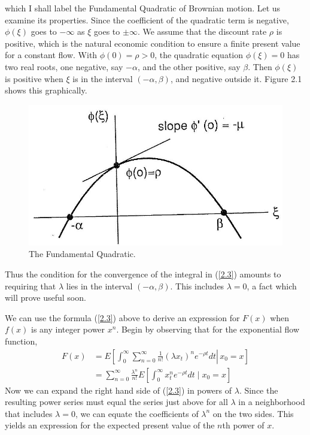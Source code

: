 \documentclass[12pt]{article}
\theoremstyle{definition}
\begin{document}
which I shall label the Fundamental Quadratic of Brownian motion. Let us examine its properties. Since the coefficient of the quadratic term is negative, $\phi(\xi)$ goes to $-\infty$ as $\xi$ goes to $\pm \infty$. We assume that the discount rate $\rho$ is positive, which is the natural economic condition to ensure a finite present value for a constant flow. With $\phi(0)=\rho>0$, the quadratic equation $\phi(\xi)=0$ has two real roots, one negative, say $-\alpha$, and the other positive, say $\beta$. Then $\phi(\xi)$ is positive when $\xi$ is in the interval $(-\alpha, \beta)$, and negative outside it. Figure 2.1 shows this graphically.
\begin{figure}
    \centering
    \includegraphics[max width=\textwidth]{2024_03_12_f639bb6397b3ab65b08bg-06}
    \caption{The Fundamental Quadratic.}
    \label{fig: 2.1}
\end{figure}

Thus the condition for the convergence of the integral in (\ref{2.3}) amounts to requiring that $\lambda$ lies in the interval $(-\alpha, \beta)$. This includes $\lambda=0$, a fact which will prove useful soon.

We can use the formula (\ref{2.3}) above to derive an expression for $F(x)$ when $f(x)$ is any integer power $x^{n}$. Begin by observing that for the exponential flow function,
\begin{align*}
F(x) & =E\left[\left.\int_{0}^{\infty} \sum_{n=0}^{\infty} \frac{1}{n !}\left(\lambda x_{t}\right)^{n} e^{-\rho t} d t \right\rvert\, x_{0}=x\right] \\
& =\sum_{n=0}^{\infty} \frac{\lambda^{n}}{n !} E\left[\int_{0}^{\infty} x_{t}^{n} e^{-\rho t} d t \mid x_{0}=x\right]
\end{align*}
Now we can expand the right hand side of (\ref{2.3}) in powers of $\lambda$. Since the resulting power series must equal the series just above for all $\lambda$ in a neighborhood that includes $\lambda=0$, we can equate the coefficients of $\lambda^{n}$ on the two sides. This yields an expression for the expected present value of the $n$th power of $x$.
\end{document}
